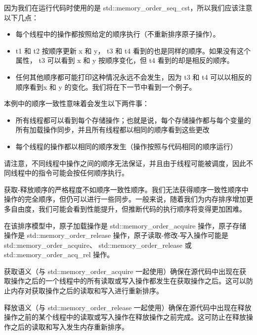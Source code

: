因为我们在运行代码时使用的是 std::memory\_order\_seq\_cst，所以我们应该注意以下几点：

\begin{itemize}
\item
每个线程中的操作都按照给定的顺序执行（不重新排序原子操作）。

\item
t1 和 t2 按顺序更新 x 和 y， t3 和 t4 看到的也是同样的顺序。如果没有这个属性， t3 可以看到 x 和 y 按顺序变化，但 t4 看到的却是相反的顺序。

\item
任何其他顺序都可能打印这种情况永远不会发生，因为 t3 和 t4 可以以相反的顺序看到x 和 y 的变化。我们将在下一节中看到一个例子。
\end{itemize}

本例中的顺序一致性意味着会发生以下两件事：

\begin{itemize}
\item
所有线程都可以看到每个存储操作；也就是说，每个存储操作都与每个变量的所有加载操作同步，并且所有线程都以相同的顺序看到这些更改

\item
每个线程的操作都以相同的顺序发生（操作按照与代码相同的顺序运行）
\end{itemize}

请注意，不同线程中操作之间的顺序无法保证，并且由于线程可能被调度，因此不同线程中的指令可能会按任何顺序执行。


获取-释放顺序的严格程度不如顺序一致性顺序。我们无法获得顺序一致性顺序中操作的完全顺序，但仍可以进行一些同步。一般来说，随着我们为内存排序增加更多自由度，我们可能会看到性能提升，但推断代码的执行顺序将变得更加困难。

在该排序模型中，原子加载操作是 std::memory\_order\_acquire 操作，原子存储操作是 std::memory\_order\_release 操作，原子读取-修改-写入操作可能是 std::memory\_order\_acquire、 std::memory\_order\_release 或 std::memory\_order\_acq\_rel 操作。

获取语义（与 std::memory\_order\_acquire 一起使用）确保在源代码中出现在获取操作之后的一个线程中的所有读取或写入操作都发生在获取操作之后。这可以防止内存对获取操作之后的读取和写入进行重新排序。

释放语义（与 std::memory\_order\_release 一起使用）确保在源代码中出现在释放操作之前的某个线程中的读取或写入操作在释放操作之前完成。这可防止在释放操作之后的读取和写入发生内存重新排序。

